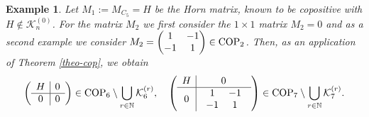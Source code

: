 \documentclass[11pt]{article}
\newcommand{\ignore}[1]{}
\newtheorem{example}[theorem]{Example}
\numberwithin{equation}{section}
\newcommand{\COP}{{\text{\rm COP}}}
\newcommand{\MK}{{\mathcal K}}
\begin{document}
\begin{example}
Let  $M_1:=M_{C_5}=H$ be the Horn matrix, known   to be copositive with $H\notin \MK_n^{(0)}$. For the matrix $M_2$ we first consider the $1\times 1$ matrix $M_2=0$ and as a second example we consider $ M_2=\begin{pmatrix} 1 & -1 \\ -1 & 1 \end{pmatrix}\in \COP_2$. Then,  as an application of Theorem \ref{theo-cop},  we obtain 
\begin{equation}\label{eqexmat}
\left(
\begin{array}{c|c}
H & 0\\
\hline
0 & 0
\end{array}
\right) \in \COP_6 \setminus \bigcup\limits_{r\in\mathbb{N}}\MK_{6}^{(r)}, \quad  \left(
\begin{array}{c|c}
H & 0\\
\hline
0 & {\begin{array}{cc}1 & -1 \\ -1 & 1
\end{array}}
\end{array}
\right)\in \COP_7\setminus \bigcup\limits_{r\in \mathbb{N}}\MK_7^{(r)}.
 \end{equation}
\ignore{$$
M'=
\begin{pmatrix}
1 & -1 & 1 & 1 & -1 & 0\\
-1 & 1 & -1 & 1 & 1 & 0 \\
1 & -1 & 1 & -1 & 1 & 0 \\
1 & 1 & -1 & 1 & -1 & 0 \\
-1 & 1 & 1 & -1 & 1 & 0 \\
0 & 0 & 0& 0 & 0 & 0
\end{pmatrix} \quad M'' = \begin{pmatrix}
1 & -1 & 1 & 1 & -1 & 0 & 0\\
-1 & 1 & -1 & 1 & 1 & 0  & 0\\
1 & -1 & 1 & -1 & 1 & 0 & 0\\
1 & 1 & -1 & 1 & -1 & 0 & 0\\
-1 & 1 & 1 & -1 & 1 & 0 & 0\\
0 & 0 & 0& 0 & 0 & 1 & -1 \\
0 & 0 & 0 & 0 & 0 & -1 & 1 
\end{pmatrix} $$}


\end{example}
\end{document}
